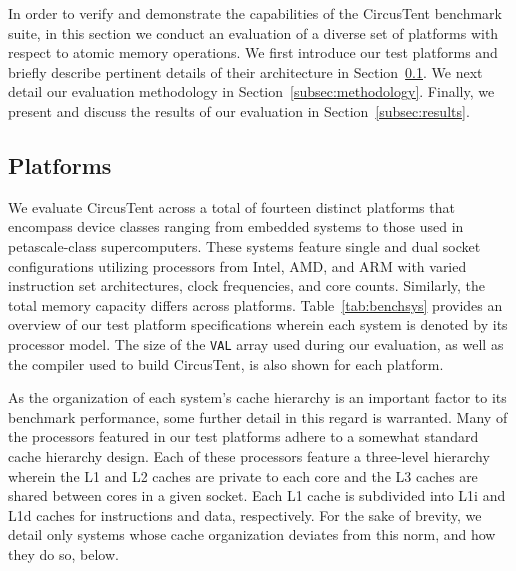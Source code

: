 
In order to verify and demonstrate the capabilities of the CircusTent benchmark suite, in this section we conduct an evaluation of a diverse set of platforms with respect to atomic memory operations.
We first introduce our test platforms and briefly describe pertinent details of their architecture in Section~\ref{subsec:platforms}.
We next detail our evaluation methodology in Section~\ref{subsec:methodology}.
Finally, we present and discuss the results of our evaluation in Section~\ref{subsec:results}.

\subsection{Platforms}
\label{subsec:platforms}

We evaluate CircusTent across a total of fourteen distinct platforms that encompass device classes ranging from embedded systems to those used in petascale-class supercomputers.
These systems feature single and dual socket configurations utilizing processors from Intel, AMD, and ARM with varied instruction set architectures, clock frequencies, and core counts.
Similarly, the total memory capacity differs across platforms.
Table~\ref{tab:benchsys} provides an overview of our test platform specifications wherein each system is denoted by its processor model.
The size of the \texttt{VAL} array used during our evaluation, as well as the compiler used to build CircusTent, is also shown for each platform.

As the organization of each system's cache hierarchy is an important factor to its benchmark performance, some further detail in this regard is warranted.
Many of the processors featured in our test platforms adhere to a somewhat standard cache hierarchy design.
Each of these processors feature a three-level hierarchy wherein the L1 and L2 caches are private to each core and the L3 caches are shared between cores in a given socket.
Each L1 cache is subdivided into L1i and L1d caches for instructions and data, respectively.
For the sake of brevity, we detail only systems whose cache organization deviates from this norm, and how they do so, below.

